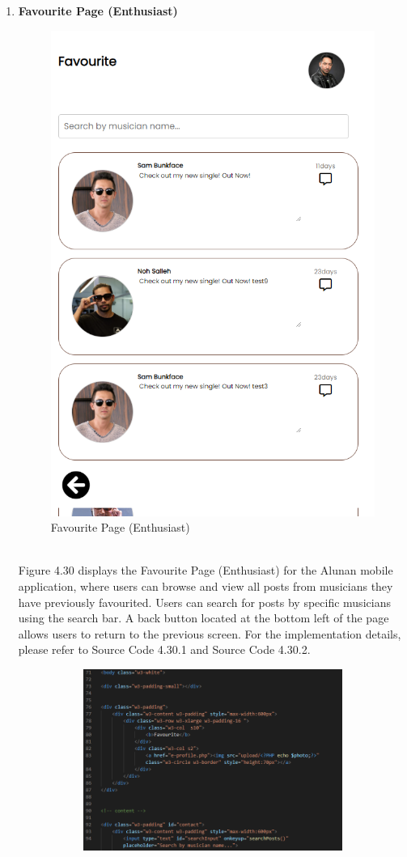 \begin{enumerate}[1.]
    \item \textbf{Favourite Page (Enthusiast)}
    \begin{figure}[h]
        \centering
        \includegraphics[width=0.5\linewidth]{mainmatter/images/frontend/ss/Favourite (Enthusiast).png}
        \caption{Favourite Page (Enthusiast)}
        \label{fig:myfig69}
    \end{figure} \\
    Figure 4.30 displays the Favourite Page (Enthusiast) for the Alunan mobile application, where users can browse and view all posts from musicians they have previously favourited. Users can search for posts by specific musicians using the search bar. A back button located at the bottom left of the page allows users to return to the previous screen. For the implementation details, please refer to Source Code 4.30.1 and Source Code 4.30.2.
    \clearpage
    \begin{figure}[h]\ContinuedFloat
        \centering
        \begin{subfigure}[b]{0.7\textwidth}
            \centering
            \includegraphics[width=\textwidth]{mainmatter/images/frontend/code/efav.png}

\end{subfigure}
\end{figure}
\end{enumerate}

